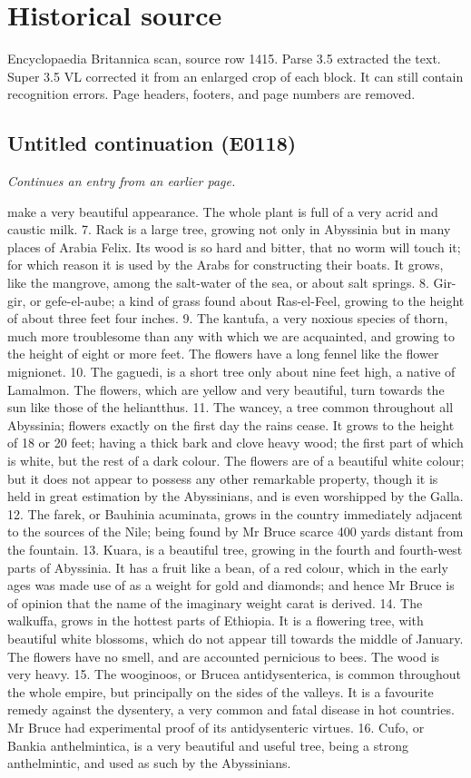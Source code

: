 \documentclass{article}
\begin{document}
\section*{Historical source}
Encyclopaedia Britannica scan, source row 1415. Parse 3.5 extracted the text. Super 3.5 VL corrected it from an enlarged crop of each block. It can still contain recognition errors.
Page headers, footers, and page numbers are removed.

\subsection*{Untitled continuation (E0118)}
\textit{Continues an entry from an earlier page.}

make a very beautiful appearance. The whole plant is full of a very acrid and caustic milk. 7. Rack is a large tree, growing not only in Abyssinia but in many places of Arabia Felix. Its wood is so hard and bitter, that no worm will touch it; for which reason it is used by the Arabs for constructing their boats. It grows, like the mangrove, among the salt-water of the sea, or about salt springs. 8. Gir-gir, or gefe-el-aube; a kind of grass found about Ras-el-Feel, growing to the height of about three feet four inches. 9. The kantufa, a very noxious species of thorn, much more troublesome than any with which we are acquainted, and growing to the height of eight or more feet. The flowers have a long fennel like the flower mignionet. 10. The gaguedi, is a short tree only about nine feet high, a native of Lamalmon. The flowers, which are yellow and very beautiful, turn towards the sun like those of the heliantthus. 11. The wancey, a tree common throughout all Abyssinia; flowers exactly on the first day the rains cease. It grows to the height of 18 or 20 feet; having a thick bark and clove heavy wood; the first part of which is white, but the rest of a dark colour. The flowers are of a beautiful white colour; but it does not appear to possess any other remarkable property, though it is held in great estimation by the Abyssinians, and is even worshipped by the Galla. 12. The farek, or Bauhinia acuminata, grows in the country immediately adjacent to the sources of the Nile; being found by Mr Bruce scarce 400 yards distant from the fountain. 13. Kuara, is a beautiful tree, growing in the fourth and fourth-west parts of Abyssinia. It has a fruit like a bean, of a red colour, which in the early ages was made use of as a weight for gold and diamonds; and hence Mr Bruce is of opinion that the name of the imaginary weight carat is derived. 14. The walkuffa, grows in the hottest parts of Ethiopia. It is a flowering tree, with beautiful white blossoms, which do not appear till towards the middle of January. The flowers have no smell, and are accounted pernicious to bees. The wood is very heavy. 15. The wooginoos, or Brucea antidysenterica, is common throughout the whole empire, but principally on the sides of the valleys. It is a favourite remedy against the dysentery, a very common and fatal disease in hot countries. Mr Bruce had experimental proof of its antidysenteric virtues. 16. Cufo, or Bankia anthelmintica, is a very beautiful and useful tree, being a strong anthelmintic, and used as such by the Abyssinians. 
\end{document}
